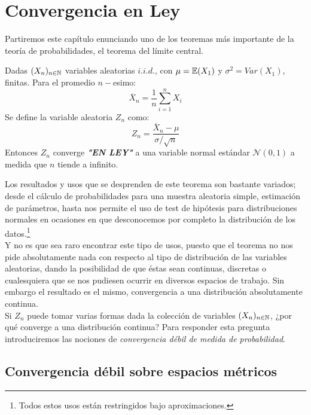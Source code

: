 \section{Convergencia en Ley}
    

\hspace{3.5mm}Partiremos este capítulo enunciando uno de los teoremas más importante de la teoría de probabilidades, el teorema del límite central.

\begin{teorema} Dadas $(X_n)_{n\in\mathbb N}$ variables aleatorias $i.i.d.$, con \newline$\mu = \mathbb E(X_1)$ y $\sigma^2 = Var(X_1)$, finitas. Para el promedio $n-$esimo:
\begin{equation}
    \overline{X}_n = \frac{1}{n}\sum_{i=1}^{n}X_i
\end{equation}
Se define la variable aleatoria $Z_n$ como:
\begin{equation}
    Z_n = \frac{\overline{X}_n - \mu}{\sigma / \sqrt{n}}
\end{equation}
Entonces $Z_n$ converge \textbf{\textit{"EN LEY"}} a una variable normal estándar $\mathcal{N}(0,1)$ a medida que $n$ tiende a infinito.
\end{teorema}

Los resultados y usos que se desprenden de este teorema son bastante variados; desde el cálculo de probabilidades para una muestra aleatoria simple, estimación de parámetros, hasta nos permite el uso de test de hipótesis para distribuciones normales en ocasiones en que desconocemos por completo la distribución de los datos.\footnote{Todos estos usos están restringidos bajo aproximaciones.}\\

Y no es que sea raro encontrar este tipo de usos, puesto que el teorema no nos pide absolutamente nada con respecto al tipo de  distribución de las variables aleatorias, dando la posibilidad de que éstas sean continuas, discretas o cualesquiera que se nos pudiesen ocurrir en diversos espacios de trabajo. Sin embargo el resultado es el mismo, convergencia a una distribución absolutamente continua.\\ 

Si $Z_n$ puede tomar varias formas dada la colección de variables $(X_n)_{n\in\mathbb N}$, ¿por qué converge a una distribución continua? Para responder esta pregunta introduciremos las nociones de \textit{convergencia débil de medida de probabilidad}.

\subsection{Convergencia débil sobre espacios métricos}

